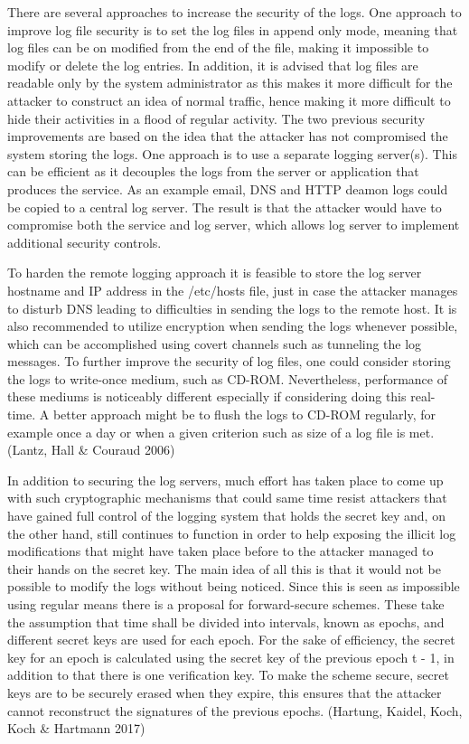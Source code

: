 \documentclass{article}
\begin{document}
There are several approaches to increase the security of the logs. One approach to improve log file security is to set the log files in append only mode, meaning that log files can be on modified from the end of the file, making it impossible to modify or delete the log entries. In addition, it is advised that log files are readable only by the system administrator as this makes it more difficult for the attacker to construct an idea of normal traffic, hence making it more difficult to hide their activities in a flood of regular activity. The two previous security improvements are based on the idea that the attacker has not compromised the system storing the logs.  One approach is to use a separate logging server(s). This can be efficient as it decouples the logs from the server or application that produces the service. As an example email, DNS and HTTP deamon logs could be copied to a central log server. The result is that the attacker would have to compromise both the service and log server, which allows log server to implement additional security controls.
\par
To harden the remote logging approach it is feasible to store the log server hostname and IP address in the /etc/hosts file, just in case the attacker manages to disturb DNS leading to difficulties in sending the logs to the remote host. It is also recommended to utilize encryption when sending the logs whenever possible, which can be accomplished using covert channels such as tunneling the log messages. To further improve the security of log files, one could consider storing the logs to write-once medium, such as CD-ROM. Nevertheless, performance of these mediums is noticeably different especially if considering doing this real-time. A better approach might be to flush the logs to CD-ROM regularly, for example once a day or when a given criterion such as size of a log file is met. (Lantz, Hall \& Couraud 2006)
\par
In addition to securing the log servers, much effort has taken place to come up with such cryptographic mechanisms that could same time resist attackers that have gained full control of the logging system that holds the secret key and, on the other hand, still continues to function in order to help exposing the illicit log modifications that might have taken place before to the attacker managed to their hands on the secret key. The main idea of all this is that it would not be possible to modify the logs without being noticed. Since this is seen as impossible using regular means there is a proposal for forward-secure schemes. These take the assumption that time shall be divided into intervals, known as epochs, and different secret keys are used for each epoch. For the sake of efficiency, the secret key for an epoch is calculated using the secret key of the previous epoch t - 1, in addition to that there is one verification key. To make the scheme secure, secret keys are to be securely erased when they expire, this ensures that the attacker cannot reconstruct the signatures of the previous epochs. (Hartung, Kaidel, Koch, Koch \& Hartmann 2017)
\end{document}
